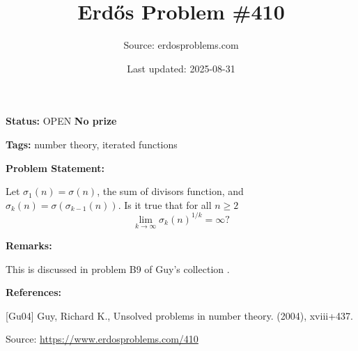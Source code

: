 \documentclass{article}
\title{Erd\H{o}s Problem \#410}
\date{Last updated: 2025-08-31}
\author{Source: erdosproblems.com}
\begin{document}
\maketitle

\noindent\textbf{Status:} OPEN \quad \textbf{No prize}

\noindent\textbf{Tags:} number theory, iterated functions

\medskip
\noindent\textbf{Problem Statement:}

Let $\sigma_1(n)=\sigma(n)$, the sum of divisors function, and $\sigma_k(n)=\sigma(\sigma_{k-1}(n))$. Is it true that for all $n\geq 2$\[\lim_{k\to \infty} \sigma_k(n)^{1/k}=\infty?\]

\bigskip
\noindent\textbf{Remarks:}

This is discussed in problem B9 of Guy's collection \cite{Gu04}.

\bigskip
\noindent\textbf{References:}

[Gu04] Guy, Richard K., Unsolved problems in number theory. (2004), xviii+437.

\bigskip
\noindent\small{Source: \url{https://www.erdosproblems.com/410}}
\end{document}
